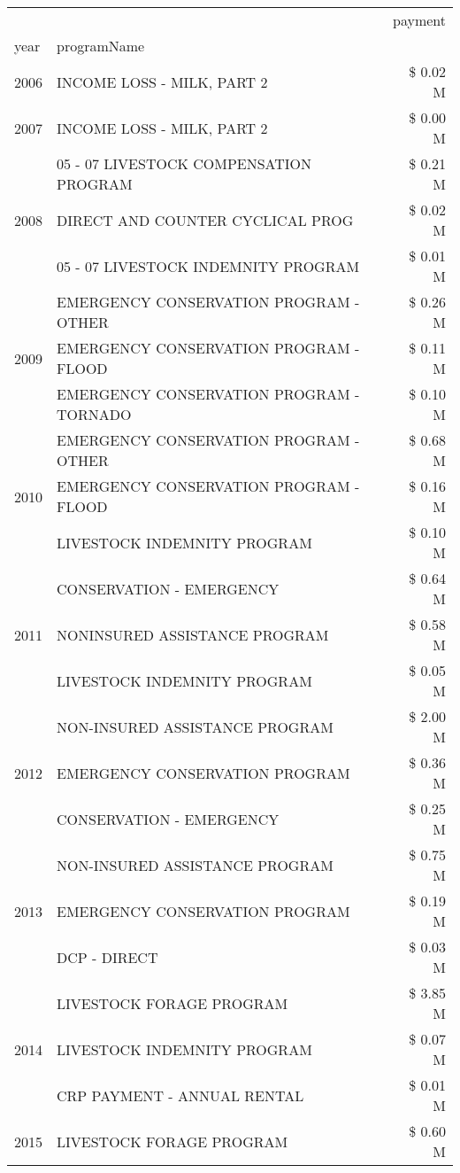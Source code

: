 \begin{tabular}{llr}
\toprule
 &  & payment \\
year & programName &  \\
\midrule
2006 & INCOME LOSS - MILK, PART 2 & \$ 0.02 M \\
\cline{1-3}
2007 & INCOME LOSS - MILK, PART 2 & \$ 0.00 M \\
\cline{1-3}
\multirow[t]{3}{*}{2008} & 05 - 07 LIVESTOCK COMPENSATION PROGRAM & \$ 0.21 M \\
 & DIRECT AND COUNTER CYCLICAL PROG & \$ 0.02 M \\
 & 05 - 07 LIVESTOCK INDEMNITY PROGRAM & \$ 0.01 M \\
\cline{1-3}
\multirow[t]{3}{*}{2009} & EMERGENCY CONSERVATION PROGRAM - OTHER & \$ 0.26 M \\
 & EMERGENCY CONSERVATION PROGRAM - FLOOD & \$ 0.11 M \\
 & EMERGENCY CONSERVATION PROGRAM - TORNADO & \$ 0.10 M \\
\cline{1-3}
\multirow[t]{3}{*}{2010} & EMERGENCY CONSERVATION PROGRAM - OTHER & \$ 0.68 M \\
 & EMERGENCY CONSERVATION PROGRAM - FLOOD & \$ 0.16 M \\
 & LIVESTOCK INDEMNITY PROGRAM & \$ 0.10 M \\
\cline{1-3}
\multirow[t]{3}{*}{2011} & CONSERVATION - EMERGENCY & \$ 0.64 M \\
 & NONINSURED ASSISTANCE PROGRAM & \$ 0.58 M \\
 & LIVESTOCK INDEMNITY PROGRAM & \$ 0.05 M \\
\cline{1-3}
\multirow[t]{3}{*}{2012} & NON-INSURED ASSISTANCE PROGRAM & \$ 2.00 M \\
 & EMERGENCY CONSERVATION PROGRAM & \$ 0.36 M \\
 & CONSERVATION - EMERGENCY & \$ 0.25 M \\
\cline{1-3}
\multirow[t]{3}{*}{2013} & NON-INSURED ASSISTANCE PROGRAM & \$ 0.75 M \\
 & EMERGENCY CONSERVATION PROGRAM & \$ 0.19 M \\
 & DCP - DIRECT & \$ 0.03 M \\
\cline{1-3}
\multirow[t]{3}{*}{2014} & LIVESTOCK FORAGE PROGRAM & \$ 3.85 M \\
 & LIVESTOCK INDEMNITY PROGRAM & \$ 0.07 M \\
 & CRP PAYMENT - ANNUAL RENTAL & \$ 0.01 M \\
\cline{1-3}
\multirow[t]{3}{*}{2015} & LIVESTOCK FORAGE PROGRAM & \$ 0.60 M \\

\end{tabular}
